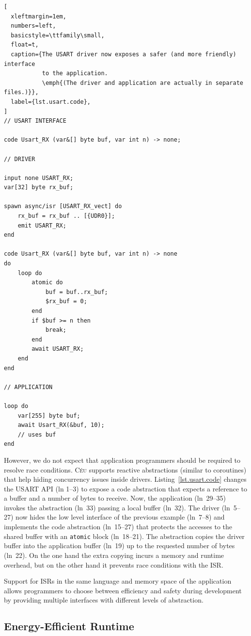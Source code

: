 \documentclass[sigplan,10pt,review,anonymous]{acmart}\settopmatter{printfolios=true,printccs=false,printacmref=false}
\newcommand{\CEU}{\textsc{C\'{e}u}\xspace}
\newcommand{\code}[1] {{\small{\texttt{#1}}}}
\begin{document}
\begin{lstlisting}[
  xleftmargin=1em,
  numbers=left,
  basicstyle=\ttfamily\small,
  float=t,
  caption={The USART driver now exposes a safer (and more friendly) interface
           to the application.
           \emph{(The driver and application are actually in separate files.)}},
  label={lst.usart.code},
]
// USART INTERFACE

code Usart_RX (var&[] byte buf, var int n) -> none;

// DRIVER

input none USART_RX;
var[32] byte rx_buf;

spawn async/isr [USART_RX_vect] do
    rx_buf = rx_buf .. [{UDR0}];
    emit USART_RX;
end

code Usart_RX (var&[] byte buf, var int n) -> none
do
    loop do
        atomic do
            buf = buf..rx_buf;
            $rx_buf = 0;
        end
        if $buf >= n then
            break;
        end
        await USART_RX;
    end
end

// APPLICATION

loop do
    var[255] byte buf;
    await Usart_RX(&buf, 10);
    // uses buf
end
\end{lstlisting}

However, we do not expect that application programmers should be required to
resolve race conditions.
\CEU supports reactive abstractions (similar to coroutines) that help hiding
concurrency issues inside drivers.
%
Listing~\ref{lst.usart.code} changes the USART API (ln 1--3) to expose a code
abstraction that expects a reference to a buffer and a number of bytes to
receive.
Now, the application (ln~29--35) invokes the abstraction (ln~33) passing a
local buffer (ln~32).
%
The driver (ln~5--27) now hides the low level interface of the previous example
(ln~7--8) and implements the code abstraction (ln~15--27) that protects the
accesses to the shared buffer with an \code{atomic} block (ln~18--21).
%
The abstraction copies the driver buffer into the application buffer (ln~19)
up to the requested number of bytes (ln~22).
%
On the one hand the extra copying incurs a memory and runtime overhead, but on
the other hand it prevents race conditions with the ISR.

Support for ISRs in the same language and memory space of the application
allows programmers to choose between efficiency and safety during development
by providing multiple interfaces with different levels of abstraction.

\subsection{Energy-Efficient Runtime}
\label{sec.energy}
\end{document}
